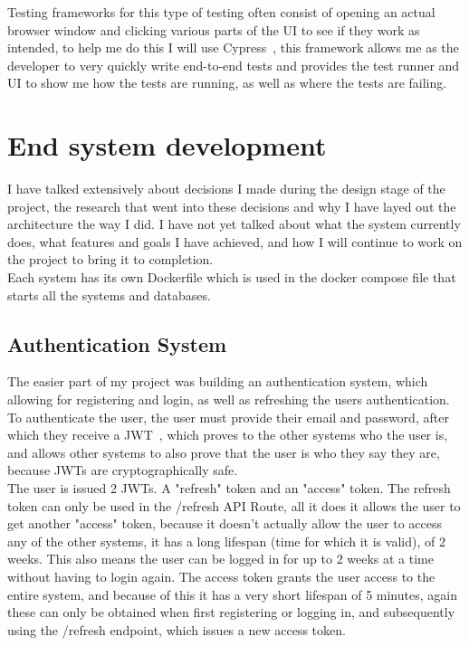 \documentclass[titlepage]{article}
\begin{document}
Testing frameworks for this type of testing often consist of opening an actual browser window and clicking various parts of the UI to see if they work as intended, to help me do this I will use Cypress~\cite{cypress}, this framework allows me as the developer to very quickly write end-to-end tests and provides the test runner and UI to show me how the tests are running, as well as where the tests are failing. 

\section{End system development}
I have talked extensively about decisions I made during the design stage of the project, the research that went into these decisions and why I have layed out the architecture the way I did. I have not yet talked about what the system currently does, what features and goals I have achieved, and how I will continue to work on the project to bring it to completion. \\

Each system has its own Dockerfile which is used in the docker compose file that starts all the systems and databases.

\subsection{Authentication System}
The easier part of my project was building an authentication system, which allowing for registering and login, as well as refreshing the users authentication. To authenticate the user, the user must provide their email and password, after which they receive a JWT~\cite{jwt}, which proves to the other systems who the user is, and allows other systems to also prove that the user is who they say they are, because JWTs are cryptographically safe. \\

The user is issued 2 JWTs. A "refresh" token and an "access" token. The refresh token can only be used in the /refresh API Route, all it does it allows the user to get another "access" token, because it doesn't actually allow the user to access any of the other systems, it has a long lifespan (time for which it is valid), of 2 weeks. This also means the user can be logged in for up to 2 weeks at a time without having to login again. The access token grants the user access to the entire system, and because of this it has a very short lifespan of 5 minutes, again these can only be obtained when first registering or logging in, and subsequently using the /refresh endpoint, which issues a new access token. \\
\end{document}
